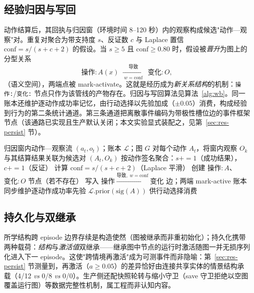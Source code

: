 \documentclass[10pt,a4paper]{ctexart}
\begin{document}
\subsection{经验归因与写回}
\label{sec:arch-wb}
动作结算后，其回执与归因窗（环境时间 8--120 秒）内的观察构成候选"动作—观察"对。重复对聚合为带支持度 $s$、反证数 $c$ 与 Laplace 置信 $\mathrm{conf}=s/(s+c+2)$ 的假设。当 $s\ge 5$ 且 $\mathrm{conf}\ge 0.80$ 时，假设被\emph{晋升}为图上的分型关系
\begin{equation}
\mathtt{操作:}A(x) \;\xrightarrow[\;w=\mathrm{conf}\;]{\;\texttt{导致}\;}\; \mathtt{变化:}O,
\label{eq:wb}
\end{equation}
（语义空间），两端点被 mark-activate。这就是经历成为\emph{新关系结构}的机制：\texttt{操作:}/\texttt{变化:} 节点只作为该管线的产物存在。归因与写回算法见算法~\ref{alg:wb}。同一账本还维护逐动作成功率记忆，由行动选择以先验加成（$\pm0.05$）消费，构成经验到行为的第二条统计通道。第三条通道把离散事件编码为带极性槽位边的事件框架节点（该通路已实现且生产默认关闭；本文实验显式装配之，见第~\ref{sec:res-persist} 节）。

\begin{algorithm}[t]
\caption{经验到关系知识的写回（归因管线）}\label{alg:wb}
\begin{algorithmic}[1]
\Require 归因窗内动作—观察流 $(a_t,o_t)$；账本 $\mathcal{L}$；图 $G$
\State 对每个动作 $A_t$，将窗内观察 $O_k$ 与其结算结果关联为候选对 $(A_t,O_k)$
\State 按动作签名聚合：$s{+}{=}1$（成功结果），$c{+}{=}1$（反证）
\State 计算 $\mathrm{conf}=s/(s+c+2)$（Laplace 平滑）
  \State 创建 $\mathtt{操作:}A$、$\mathtt{变化:}O$ 节点（若不存在）
  \State 写入 $\mathtt{操作} \xrightarrow{\texttt{导致},\; w=\mathrm{conf}} \mathtt{变化}$ 边；两端 mark-active
\EndIf
\State 账本同步维护逐动作成功率先验 $\mathcal{L}.\mathrm{prior}(\mathrm{sig}(A))$ 供行动选择消费
\end{algorithmic}
\end{algorithm}

\subsection{持久化与双继承}
\label{sec:arch-persist}
所学结构跨 episode 边界存续是构造使然（图被继承而非重初始化）；持久化携带两种载荷：\emph{结构}与\emph{激活值}双继承——继承图中节点的运行时激活随图一并无损序列化进入下一 episode。这使"跨情境再激活"成为可测事件而非隐喻：第~\ref{sec:res-persist} 节测量到，再激活（$a\ge0.05$）的差异恰好由连接共享实体的情景结构承载（4/12 \emph{vs} 0/8 \emph{vs} 0/0）。生产侧还配快照轮转与缩小守卫（save 守卫拒绝以空图覆盖运行图）等数据完整性机制，属工程而非认知内容。
\end{document}
